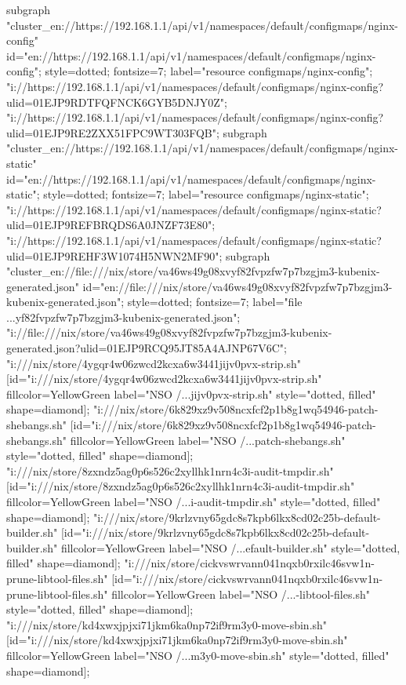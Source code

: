 {{}
subgraph "cluster_en://https://192.168.1.1/api/v1/namespaces/default/configmaps/nginx-config" {
id="en://https://192.168.1.1/api/v1/namespaces/default/configmaps/nginx-config";
style=dotted;
fontsize=7;
label="resource configmaps/nginx-config";
"i://https://192.168.1.1/api/v1/namespaces/default/configmaps/nginx-config?ulid=01EJP9RDTFQFNCK6GYB5DNJY0Z";
"i://https://192.168.1.1/api/v1/namespaces/default/configmaps/nginx-config?ulid=01EJP9RE2ZXX51FPC9WT303FQB";
}
subgraph "cluster_en://https://192.168.1.1/api/v1/namespaces/default/configmaps/nginx-static" {
id="en://https://192.168.1.1/api/v1/namespaces/default/configmaps/nginx-static";
style=dotted;
fontsize=7;
label="resource configmaps/nginx-static";
"i://https://192.168.1.1/api/v1/namespaces/default/configmaps/nginx-static?ulid=01EJP9REFBRQDS6A0JNZF73E80";
"i://https://192.168.1.1/api/v1/namespaces/default/configmaps/nginx-static?ulid=01EJP9REHF3W1074H5NWN2MF90";
}
subgraph "cluster_en://file:///nix/store/va46ws49g08xvyf82fvpzfw7p7bzgjm3-kubenix-generated.json" {
id="en://file:///nix/store/va46ws49g08xvyf82fvpzfw7p7bzgjm3-kubenix-generated.json";
style=dotted;
fontsize=7;
label="file ...yf82fvpzfw7p7bzgjm3-kubenix-generated.json";
"i://file:///nix/store/va46ws49g08xvyf82fvpzfw7p7bzgjm3-kubenix-generated.json?ulid=01EJP9RCQ95JT85A4AJNP67V6C";
}
"i:///nix/store/4ygqr4w06zwcd2kcxa6w3441jijv0pvx-strip.sh" [id="i:///nix/store/4ygqr4w06zwcd2kcxa6w3441jijv0pvx-strip.sh" fillcolor=YellowGreen label="NSO /...jijv0pvx-strip.sh" style="dotted, filled" shape=diamond];
"i:///nix/store/6k829xz9v508ncxfcf2p1b8g1wq54946-patch-shebangs.sh" [id="i:///nix/store/6k829xz9v508ncxfcf2p1b8g1wq54946-patch-shebangs.sh" fillcolor=YellowGreen label="NSO /...patch-shebangs.sh" style="dotted, filled" shape=diamond];
"i:///nix/store/8zxndz5ag0p6s526c2xyllhk1nrn4c3i-audit-tmpdir.sh" [id="i:///nix/store/8zxndz5ag0p6s526c2xyllhk1nrn4c3i-audit-tmpdir.sh" fillcolor=YellowGreen label="NSO /...i-audit-tmpdir.sh" style="dotted, filled" shape=diamond];
"i:///nix/store/9krlzvny65gdc8s7kpb6lkx8cd02c25b-default-builder.sh" [id="i:///nix/store/9krlzvny65gdc8s7kpb6lkx8cd02c25b-default-builder.sh" fillcolor=YellowGreen label="NSO /...efault-builder.sh" style="dotted, filled" shape=diamond];
"i:///nix/store/cickvswrvann041nqxb0rxilc46svw1n-prune-libtool-files.sh" [id="i:///nix/store/cickvswrvann041nqxb0rxilc46svw1n-prune-libtool-files.sh" fillcolor=YellowGreen label="NSO /...-libtool-files.sh" style="dotted, filled" shape=diamond];
"i:///nix/store/kd4xwxjpjxi71jkm6ka0np72if9rm3y0-move-sbin.sh" [id="i:///nix/store/kd4xwxjpjxi71jkm6ka0np72if9rm3y0-move-sbin.sh" fillcolor=YellowGreen label="NSO /...m3y0-move-sbin.sh" style="dotted, filled" shape=diamond];
}
